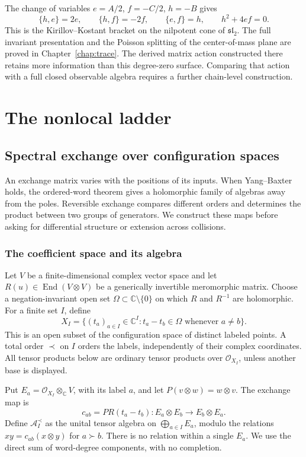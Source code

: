 The change of variables $e=A/2$, $f=-C/2$, $h=-B$ gives
\[
 \{h,e\}=2e,\qquad \{h,f\}=-2f,\qquad
 \{e,f\}=h,\qquad h^2+4ef=0.
\]
This is the Kirillov--Kostant bracket on the nilpotent cone of
$\mathfrak{sl}_2$.  The full invariant presentation and the Poisson splitting
of the center-of-mass plane are proved in Chapter~\ref{chap:trace}.
The derived matrix action constructed there retains more information than
this degree-zero surface.  Comparing that action with a full closed
observable algebra requires a further chain-level construction.

\part{The nonlocal ladder}

\chapter{Spectral exchange over configuration spaces}\label{cbc:spectral:chapter}
An exchange matrix varies with the positions of its inputs.  When Yang--Baxter
holds, the ordered-word theorem gives a holomorphic family of algebras
away from the poles.  Reversible exchange compares different orders and determines the
product between two groups of generators.  We construct these maps before
asking for differential structure or extension across collisions.

\section{The coefficient space and its algebra}
Let $V$ be a finite-dimensional complex vector space and let
$R(u)\in\operatorname{End}(V\otimes V)$ be a generically invertible
meromorphic matrix.  Choose a negation-invariant open set
$\Omega\subset\mathbb C\setminus\{0\}$ on which $R$ and $R^{-1}$ are
holomorphic.  For a finite set $I$, define
\[
 X_I=\{(t_a)_{a\in I}\in\mathbb C^I:
                  t_a-t_b\in\Omega\text{ whenever }a\ne b\}.
\]
This is an open subset of the configuration space of distinct labeled
points.  A total order $\prec$ on $I$ orders the labels, independently of
their complex coordinates.  All tensor products below are ordinary tensor
products over $\mathcal O_{X_I}$, unless another base is displayed.

Put $E_a=\mathcal O_{X_I}\otimes_{\mathbb C}V$, with its label $a$, and let
$P(v\otimes w)=w\otimes v$.  The exchange map is
\[
 c_{ab}=P R(t_a-t_b):E_a\otimes E_b\longrightarrow E_b\otimes E_a.
\]
Define $\mathcal A_I^{\prec}$ as the unital tensor algebra on
$\bigoplus_{a\in I}E_a$, modulo the relations
$x y=c_{ab}(x\otimes y)$ for $a\succ b$.
There is no relation within a single $E_a$.
We use the direct sum of word-degree components, with no completion.

